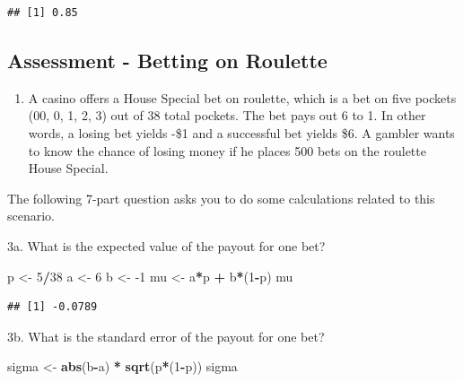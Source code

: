 \documentclass[
]{article}
\newenvironment{Shaded}{\begin{snugshade}}{\end{snugshade}}
\newcommand{\DecValTok}[1]{\textcolor[rgb]{0.00,0.00,0.81}{#1}}
\newcommand{\KeywordTok}[1]{\textcolor[rgb]{0.13,0.29,0.53}{\textbf{#1}}}
\newcommand{\NormalTok}[1]{#1}
\newcommand{\OperatorTok}[1]{\textcolor[rgb]{0.81,0.36,0.00}{\textbf{#1}}}
\newcommand{\StringTok}[1]{\textcolor[rgb]{0.31,0.60,0.02}{#1}}
\providecommand{\tightlist}{%
  \setlength{\itemsep}{0pt}\setlength{\parskip}{0pt}}
\begin{document}
\begin{verbatim}
## [1] 0.85
\end{verbatim}

\hypertarget{assessment---betting-on-roulette}{%
\subsection{Assessment - Betting on
Roulette}\label{assessment---betting-on-roulette}}

\begin{enumerate}
\def\labelenumi{\arabic{enumi}.}
\setcounter{enumi}{2}
\tightlist
\item
  A casino offers a House Special bet on roulette, which is a bet on
  five pockets (00, 0, 1, 2, 3) out of 38 total pockets. The bet pays
  out 6 to 1. In other words, a losing bet yields -\$1 and a successful
  bet yields \$6. A gambler wants to know the chance of losing money if
  he places 500 bets on the roulette House Special.
\end{enumerate}

The following 7-part question asks you to do some calculations related
to this scenario.

3a. What is the expected value of the payout for one bet?

\begin{Shaded}
\begin{Highlighting}[]
\NormalTok{p \textless{}{-}}\StringTok{ }\DecValTok{5}\OperatorTok{/}\DecValTok{38}
\NormalTok{a \textless{}{-}}\StringTok{ }\DecValTok{6}
\NormalTok{b \textless{}{-}}\StringTok{ }\DecValTok{{-}1}
\NormalTok{mu \textless{}{-}}\StringTok{ }\NormalTok{a}\OperatorTok{*}\NormalTok{p }\OperatorTok{+}\StringTok{ }\NormalTok{b}\OperatorTok{*}\NormalTok{(}\DecValTok{1}\OperatorTok{{-}}\NormalTok{p)}
\NormalTok{mu}
\end{Highlighting}
\end{Shaded}

\begin{verbatim}
## [1] -0.0789
\end{verbatim}

3b. What is the standard error of the payout for one bet?

\begin{Shaded}
\begin{Highlighting}[]
\NormalTok{sigma \textless{}{-}}\StringTok{ }\KeywordTok{abs}\NormalTok{(b}\OperatorTok{{-}}\NormalTok{a) }\OperatorTok{*}\StringTok{ }\KeywordTok{sqrt}\NormalTok{(p}\OperatorTok{*}\NormalTok{(}\DecValTok{1}\OperatorTok{{-}}\NormalTok{p))}
\NormalTok{sigma}
\end{Highlighting}
\end{Shaded}
\end{document}
